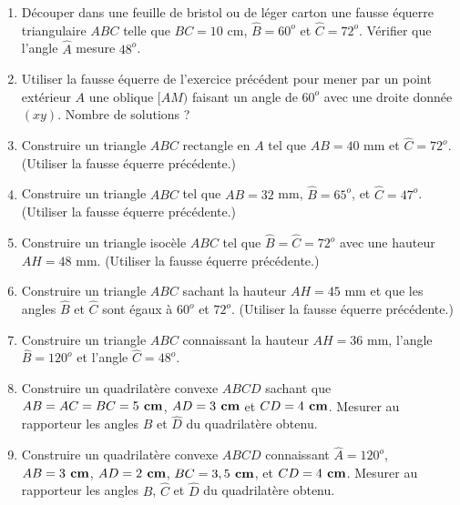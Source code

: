\begin{enumerate}
\item Découper dans une feuille de bristol ou de léger carton une fausse équerre triangulaire $ABC$ telle que $BC=10$ cm, $\widehat{B}=60^o$ et $\widehat{C}=72^o$. 
Vérifier que l'angle $\widehat{A}$ mesure $48^o$.
\item Utiliser la fausse équerre de l'exercice précédent pour mener par un point extérieur $A$ une oblique $[AM)$ faisant un angle de $60^o$ avec une droite donnée $(xy)$. Nombre de solutions ?
\item Construire un triangle $ABC$ rectangle en $A$ tel que $AB=40$ mm et $\widehat{C}= 72^o$. (Utiliser la fausse équerre précédente.)
\item Construire un triangle $ABC$ tel que $AB= 32$ mm, $\widehat{B}= 65^o$, et $\widehat{C}= 47^o$. (Utiliser la fausse équerre précédente.)
\item Construire un triangle isocèle $ABC$ tel que $\widehat{B}= \widehat{C}= 72^o$ avec une hauteur $AH=48$ mm. (Utiliser la fausse équerre précédente.)
\item Construire un triangle $ABC$ sachant la hauteur $AH=45$ mm et que les angles $\widehat{B}$ et $\widehat{C}$ sont égaux à $60^o$ et $72^o$. (Utiliser la fausse équerre précédente.)
\item Construire un triangle $ABC$ connaissant la hauteur $AH= 36$ mm, l'angle $\widehat{B}=120^o$ et l'angle $\widehat{C}= 48^o$. 
\item Construire un quadrilatère convexe $ABCD$ sachant que $AB=AC= BC=5\textbf{ cm}$, $AD=3\textbf{ cm}$ et $CD=4\textbf{ cm}$. Mesurer au rapporteur les angles $\widehat{B}$ et $\widehat{D}$ du quadrilatère obtenu.
\item Construire un quadrilatère convexe $ABCD$ connaissant $\widehat{A}=120^o$, $AB=3\textbf{ cm}$, $AD=2\textbf{ cm}$, $BC=3,5\textbf{ cm}$, et $CD=4\textbf{ cm}$. Mesurer au rapporteur les angles
$\widehat{B}$, $\widehat{C}$ et $\widehat{D}$ du quadrilatère obtenu.
\end{enumerate}